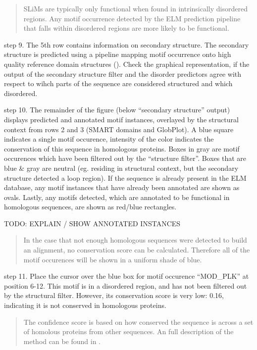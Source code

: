 \begin{quote}
SLiMs are typically only functional when found in intrinsically
disordered regions. Any motif occurrence detected by the ELM prediction
pipeline that falls within disordered regions are more likely to be
functional.
\end{quote}

step 9. The 5th row contains information on secondary structure. The
secondary structure is predicted using a pipeline mapping motif
occurrence onto high quality reference domain structures
(\cite{19852836}). Check the graphical representation, if the output of
the secondary structure filter and the disorder predictors agree with
respect to wihch parts of the sequence are considered structured and
which disordered.

step 10. The remainder of the figure (below ``secondary structure''
output) displays predicted and annotated motif instances, overlayed by
the structural context from rows 2 and 3 (SMART domains and GlobPlot). A
blue square indicates a single motif occurence, intensity of the color
indicates the conservation of this sequence in homologous proteins.
Boxes in gray are motif occurences which have been filtered out by the
``structure filter''. Boxes that are blue \& gray are neutral (eg.
residing in structural context, but the secondary structure detected a
loop region). If the sequence is already present in the ELM database,
any motif instances that have already been annotated are shown as ovals.
Lastly, any motifs detected, which are annotated to be functional in
homologous sequences, are shown as red/blue rectangles.

TODO: EXPLAIN / SHOW ANNOTATED INSTANCES

\begin{quote}
In the case that not enough homologous sequences were detected to build
an alignment, no conservation score can be calculated. Therefore all of
the motif occurences will be shown in a uniform shade of blue.
\end{quote}

step 11. Place the cursor over the blue box for motif occurence
``MOD\_PLK'' at position 6-12. This motif is in a disordered region, and
has not been filtered out by the structural filter. However, its
conservation score is very low: 0.16, indicating it is not conserved in
homologous proteins.

\begin{quote}
The confidence score is based on how conserved the sequence is across a
set of homolous proteins from other sequences. An full description of
the method can be found in \cite{18460207}.
\end{quote}

